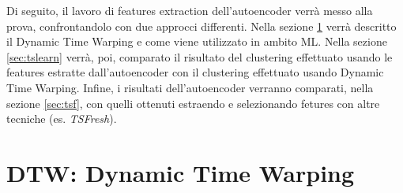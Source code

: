 Di seguito, il lavoro di features extraction dell'autoencoder verrà messo alla prova, confrontandolo con due approcci differenti. Nella sezione \ref{sec:dtw} verrà descritto il Dynamic Time Warping e come viene utilizzato in ambito ML. Nella sezione \ref{sec:tslearn} verrà, poi, comparato il risultato del clustering effettuato usando le features estratte dall'autoencoder con il clustering effettuato usando Dynamic Time Warping. Infine, i risultati dell'autoencoder verranno comparati, nella sezione \ref{sec:tsf}, con quelli ottenuti estraendo e selezionando fetures con altre tecniche (es. \textit{TSFresh}).


\section{DTW: Dynamic Time Warping}\label{sec:dtw}

